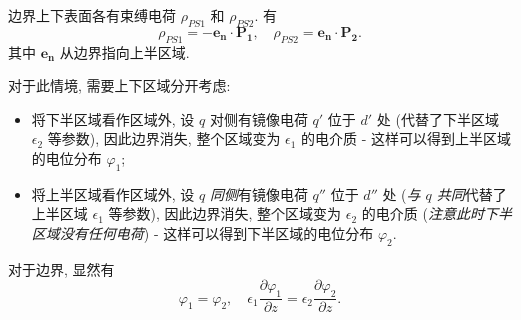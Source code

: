 边界上下表面各有束缚电荷 $\rho_{PS1}$ 和 $\rho_{PS2}$. 有
\begin{equation}
    \rho_{PS1}=-\bm{e_n}\cdot\bm{P_1}, \quad \rho_{PS2}=\bm{e_n}\cdot\bm{P_2}.
\end{equation}
其中 $\bm{e_n}$ 从边界指向上半区域.

对于此情境, 需要上下区域分开考虑:
\begin{itemize}
    \item 将下半区域看作区域外, 设 $q$ 对侧有镜像电荷 $q'$ 位于 $d'$ 处 (代替了下半区域 $\epsilon_2$ 等参数), 因此边界消失, 整个区域变为 $\epsilon_1$ 的电介质 - 这样可以得到上半区域的电位分布 $\varphi_1$;
    \item 将上半区域看作区域外, 设 $q$ \textit{同侧}有镜像电荷 $q''$ 位于 $d''$ 处 (\textit{与 $q$ 共同}代替了上半区域 $\epsilon_1$ 等参数), 因此边界消失, 整个区域变为 $\epsilon_2$ 的电介质 (\textit{注意此时下半区域没有任何电荷}) - 这样可以得到下半区域的电位分布 $\varphi_2$.
\end{itemize}

对于边界, 显然有
\begin{equation}
    \varphi_1=\varphi_2, \quad \epsilon_1\frac{\partial\varphi_1}{\partial z}=\epsilon_2\frac{\partial\varphi_2}{\partial z}.
\end{equation}
